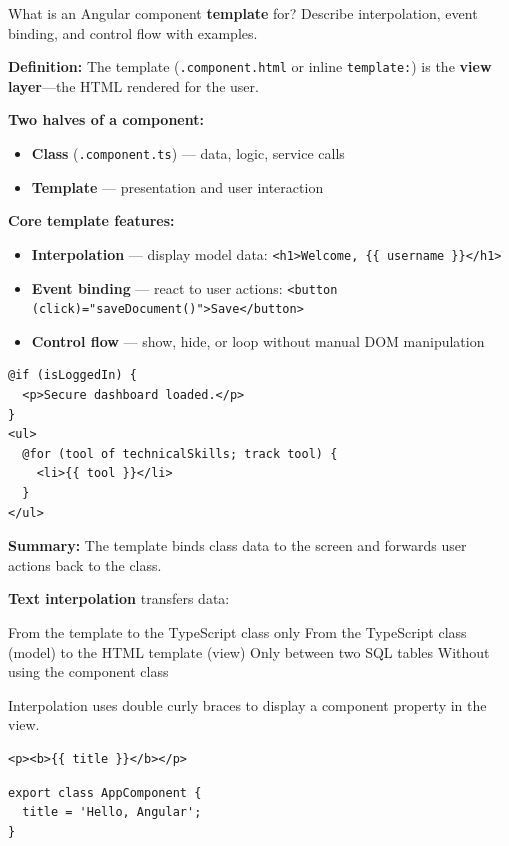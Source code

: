 \question[6]
What is an Angular component \textbf{template} for? Describe interpolation, event binding, and control flow with examples.
\begin{solutionorbox}[4.75in]
\textbf{Definition:} The template (\texttt{.component.html} or inline \lstinline[style=tsinline]|template:|) is the \textbf{view layer}---the HTML rendered for the user.

\textbf{Two halves of a component:}
\begin{itemize}
  \item \textbf{Class} (\texttt{.component.ts}) --- data, logic, service calls
  \item \textbf{Template} --- presentation and user interaction
\end{itemize}

\textbf{Core template features:}
\begin{itemize}
  \item \textbf{Interpolation} --- display model data: \lstinline[style=htmlinline]|<h1>Welcome, {{ username }}</h1>|
  \item \textbf{Event binding} --- react to user actions: \lstinline[style=htmlinline]|<button (click)="saveDocument()">Save</button>|
  \item \textbf{Control flow} --- show, hide, or loop without manual DOM manipulation
\end{itemize}

\begin{lstlisting}[style=htmlinline]
@if (isLoggedIn) {
  <p>Secure dashboard loaded.</p>
}
<ul>
  @for (tool of technicalSkills; track tool) {
    <li>{{ tool }}</li>
  }
</ul>
\end{lstlisting}

\textbf{Summary:} The template binds class data to the screen and forwards user actions back to the class.
\end{solutionorbox}



\question[4]
\textbf{Text interpolation} transfers data:
\begin{choices}
  \choice From the template to the TypeScript class only
  \CorrectChoice From the TypeScript class (model) to the HTML template (view)
  \choice Only between two SQL tables
  \choice Without using the component class
\end{choices}
\begin{solution}
  Interpolation uses double curly braces to display a component property in the view.
\begin{lstlisting}[style=htmlinline]
<p><b>{{ title }}</b></p>
\end{lstlisting}
\begin{lstlisting}[style=ts]
export class AppComponent {
  title = 'Hello, Angular';
}
\end{lstlisting}
\end{solution}




